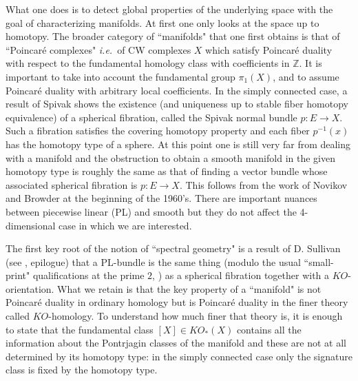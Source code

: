 \documentclass[12pt]{article}
\def\Z{{\mathbb Z}}
\newcommand{\ie}{{\it i.e.\/}\ }
\begin{document}
 What one does is to detect global properties of the underlying space with the goal of characterizing manifolds. At first one only looks at the space up to homotopy. The broader category of ``manifolds" that one first obtains is that of ``Poincar\' e complexes" \ie of CW complexes $X$ which satisfy Poincar\' e duality with respect to the fundamental homology class  with coefficients in $\Z$. It is important to take into account the fundamental group $\pi_1(X)$, and to assume Poincar\' e duality with arbitrary local coefficients. In the simply connected case, a result of Spivak \cite{spivak} shows the existence (and  uniqueness up to stable fiber homotopy equivalence) of a spherical fibration, called the Spivak normal bundle $p:E\to X$. Such a fibration satisfies the covering homotopy property and each fiber $p^{-1}(x)$ has the homotopy type of a sphere. At this point one is still very far from dealing with a manifold and the obstruction to obtain a smooth manifold in the given homotopy type is roughly the same as that of finding a vector bundle whose associated spherical fibration is $p:E\to X$. This follows from the work of Novikov and Browder at the beginning of the 1960's.  There are important nuances between piecewise linear (PL) and smooth but they do not affect the 4-dimensional case in which we are interested. 
 
 The first key root of the notion of ``spectral geometry" is a result of D. Sullivan (see \cite{MS}, epilogue) that a PL-bundle is the same thing (modulo the usual ``small-print" qualifications at the prime $2$, \cite{Siegel}) as a spherical fibration together with a $KO$-orientation. What we retain is that the key property of a ``manifold" is not Poincar\' e duality in ordinary homology but is Poincar\' e duality in the finer theory called $KO$-homology. To understand how much finer that theory is, it is enough to state that the fundamental class $[X]\in KO_*(X)$ contains all the information about the Pontrjagin classes of the manifold and these are not at all determined by its homotopy type: in the simply connected case only the signature class is fixed by the homotopy type.
 
\end{document}
